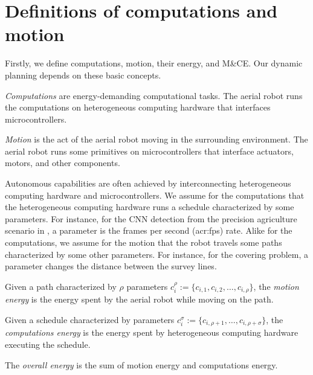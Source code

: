 \section{Definitions of computations and motion}
\label{sec:definitions}

Firstly, we define computations, motion, their energy, and M\&CE. Our dynamic planning depends on these basic concepts.

\begin{highlight}
  \begin{defn}\label{def:comps}
    \emph{Computations} are energy-demanding computational tasks. The aerial robot runs the computations on heterogeneous computing hardware that interfaces microcontrollers.
    
    \emph{Motion} is the act of the aerial robot moving in the surrounding environment. The aerial robot runs some primitives on microcontrollers that interface actuators, motors, and other components.
  \end{defn}
\end{highlight}

Autonomous capabilities are often achieved by interconnecting heterogeneous computing hardware and microcontrollers. We assume for the computations that the heterogeneous computing hardware runs a schedule characterized by some parameters. For instance, for the CNN detection from the precision agriculture scenario in , a parameter is the frames per second (\Gls{acr:fps}) rate. Alike for the computations, we assume for the motion that the robot travels some paths characterized by some other parameters. For instance, for the covering problem, a parameter changes the distance between the survey lines.

\begin{highlight}
\begin{defn}\label{def:comp-mot-energy}
  Given a path characterized by $\rho$ parameters $c_i^\rho:=\{c_{i,1},c_{i,2},\dots,c_{i,\rho}\}$, the \emph{motion energy} is the energy spent by the aerial robot while moving on the path.

  Given a schedule characterized by parameters $c_i^\sigma:=\{c_{i,\rho+1},\dots,c_{i,\rho+\sigma}\}$, the \emph{computations energy} is the energy spent by heterogeneous computing hardware executing the schedule.

  The \emph{overall energy} is the sum of motion energy and computations energy.
\end{defn}
\end{highlight}

